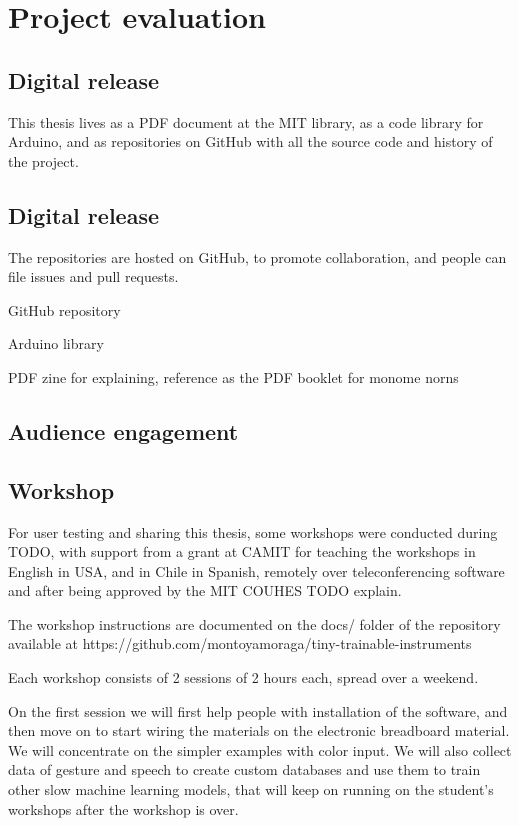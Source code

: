 \chapter{Project evaluation}

\section{Digital release}

This thesis lives as a PDF document at the MIT library, as a code library for Arduino, and as repositories on GitHub with all the source code and history of the project.

\section{Digital release}

The repositories are hosted on GitHub, to promote collaboration, and people can file issues and pull requests.

GitHub repository

Arduino library

PDF zine for explaining, reference as the PDF booklet for monome norns

\section{Audience engagement}


\section{Workshop}

For user testing and sharing this thesis, some workshops were conducted during TODO, with support from a grant at CAMIT for teaching the workshops in English in USA, and in Chile in Spanish, remotely over teleconferencing software and after being approved by the MIT COUHES TODO explain.

The workshop instructions are documented on the docs/ folder of the repository available at https://github.com/montoyamoraga/tiny-trainable-instruments

Each workshop consists of 2 sessions of 2 hours each, spread over a weekend.

On the first session we will first help people with installation of the software, and then move on to start wiring the materials on the electronic breadboard material. We will concentrate on the simpler examples with color input. We will also collect data of gesture and speech to create custom databases and use them to train other slow machine learning models, that will keep on running on the student's workshops after the workshop is over.

